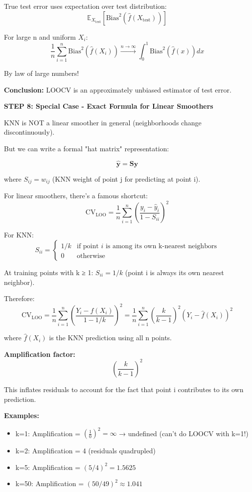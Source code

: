 \documentclass[12pt]{article}
\begin{document}
\begin{solution}
True test error uses expectation over test distribution:
\[
\mathbb{E}_{X_{\text{test}}}[\text{Bias}^2(\hat{f}(X_{\text{test}}))]
\]

For large n and uniform $X_i$:
\[
\frac{1}{n}\sum_{i=1}^n \text{Bias}^2(\hat{f}(X_i)) \xrightarrow{n \to \infty} \int_0^1 \text{Bias}^2(\hat{f}(x))dx
\]

By law of large numbers!

\textbf{Conclusion:} LOOCV is an approximately unbiased estimator of test error.

\textbf{STEP 8: Special Case - Exact Formula for Linear Smoothers}

KNN is NOT a linear smoother in general (neighborhoods change discontinuously).

But we can write a formal "hat matrix" representation:

\[
\hat{\mathbf{y}} = \mathbf{S}\mathbf{y}
\]

where $S_{ij} = w_{ij}$ (KNN weight of point j for predicting at point i).

For linear smoothers, there's a famous shortcut:
\[
\text{CV}_{\text{LOO}} = \frac{1}{n}\sum_{i=1}^n \left(\frac{y_i - \hat{y}_i}{1 - S_{ii}}\right)^2
\]

For KNN:
\[
S_{ii} = \begin{cases}
1/k & \text{if point } i \text{ is among its own k-nearest neighbors} \\
0 & \text{otherwise}
\end{cases}
\]

At training points with k ≥ 1: $S_{ii} = 1/k$ (point i is always its own nearest neighbor).

Therefore:
\[
\boxed{
\text{CV}_{\text{LOO}} = \frac{1}{n}\sum_{i=1}^n \left(\frac{Y_i - \hat{f}(X_i)}{1 - 1/k}\right)^2 = \frac{1}{n}\sum_{i=1}^n \left(\frac{k}{k-1}\right)^2(Y_i - \hat{f}(X_i))^2
}
\]

where $\hat{f}(X_i)$ is the KNN prediction using all n points.

\textbf{Amplification factor:}
\[
\left(\frac{k}{k-1}\right)^2
\]

This inflates residuals to account for the fact that point i contributes to its own prediction.

\textbf{Examples:}
\begin{itemize}
    \item k=1: Amplification = $\left(\frac{1}{0}\right)^2 = \infty$ → undefined (can't do LOOCV with k=1!)
    \item k=2: Amplification = 4 (residuals quadrupled)
    \item k=5: Amplification = $(5/4)^2 = 1.5625$
    \item k=50: Amplification = $(50/49)^2 \approx 1.041$
\end{itemize}


\end{solution}
\end{document}
